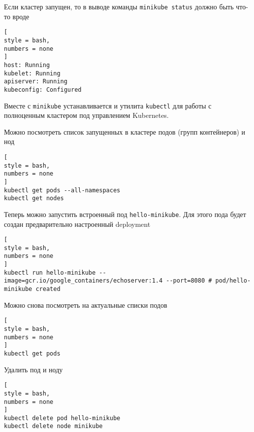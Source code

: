 \documentclass[%
	11pt,
	a4paper,
	utf8,
		]{article}
\begin{document}
Если кластер запущен, то в выводе команды \texttt{minikube status} должно быть что-то вроде
\begin{lstlisting}[
style = bash,
numbers = none	
]
host: Running
kubelet: Running
apiserver: Running
kubeconfig: Configured
\end{lstlisting}

Вместе с \texttt{minikube} устанавливается и утилита \texttt{kubectl} для работы с полноценным кластером под управлением Kubernetes.

Можно посмотреть список запущенных в кластере подов (групп контейнеров) и нод
\begin{lstlisting}[
style = bash,
numbers = none	
]
kubectl get pods --all-namespaces
kubectl get nodes
\end{lstlisting}

Теперь можно запустить встроенный под \texttt{hello-minikube}. Для этого пода будет создан предварительно настроенный deployment
\begin{lstlisting}[
style = bash,
numbers = none	
]
kubectl run hello-minikube --image=gcr.io/google_containers/echoserver:1.4 --port=8080 # pod/hello-minikube created
\end{lstlisting}

Можно снова посмотреть на актуальные списки подов
\begin{lstlisting}[
style = bash,
numbers = none	
]
kubectl get pods
\end{lstlisting}

Удалить под и ноду
\begin{lstlisting}[
style = bash,
numbers = none	
]
kubectl delete pod hello-minikube
kubectl delete node minikube
\end{lstlisting}



\begin{thebibliography}{99}
\end{thebibliography}


\lstlistoflistings{}
\end{document}

